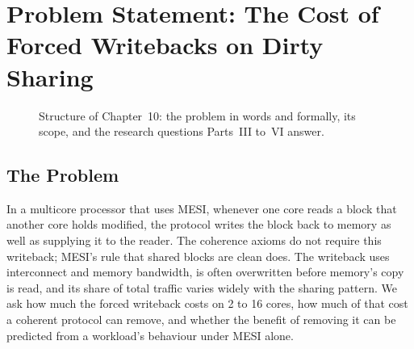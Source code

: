 \chapter{Problem Statement: The Cost of Forced Writebacks on Dirty Sharing}
\label{ch:problem}

\begin{figure}[htbp]
\centering
{}
\caption[]{Structure of Chapter~10: the problem in words
and formally, its scope, and the research questions Parts~III to~VI answer.}
\label{fig:ch10-map}
\end{figure}

\section{The Problem}
\label{sec:prob-sentence}
\label{sec:prob-formal}
%

\begin{problembox}
In a multicore processor that uses MESI, whenever one core reads a block that
another core holds modified, the protocol writes the block back to memory as well
as supplying it to the reader. The coherence axioms do not require this writeback;
MESI's rule that shared blocks are clean does. The writeback uses interconnect and
memory bandwidth, is often overwritten before memory's copy is read, and its share
of total traffic varies widely with the sharing pattern. We ask how much the
forced writeback costs on 2 to 16 cores, how much of that cost a coherent protocol
can remove, and whether the benefit of removing it can be predicted from a
workload's behaviour under MESI alone.
\end{problembox}

